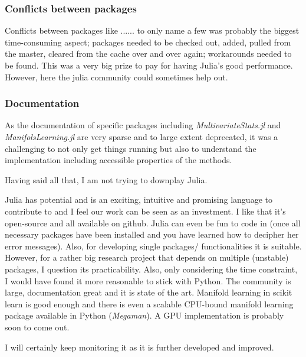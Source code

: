 \documentclass[journal, a4paper]{IEEEtran}
\begin{document}
\subsubsection{Conflicts between packages}
Conflicts between packages like ...... to only name a few was probably the biggest time-consuming aspect; packages needed to be checked out, added, pulled from the master, cleared from the cache over and over again; workarounds needed to be found. This was a very big prize to pay for having Julia's good performance. 
However, here the julia community could sometimes help out.

\subsubsection{Documentation}
As the documentation of specific packages including \textit{MultivariateStats.jl} and \textit{ManifolsLearning.jl} are very sparse and to large extent deprecated, it was a challenging to not only get things running but also to understand the implementation including accessible properties of the methods.

Having said all that, I am not trying to downplay Julia. 

Julia has potential and is an exciting, intuitive and promising language to contribute to and I feel our work can be seen as an investment. I like that it's open-source and all available on github. Julia can even be fun to code in (once all necessary packages have been installed and you have learned how to decipher her error messages). Also, for developing single packages/ functionalities it is suitable. However, for a rather big research project that depends on multiple (unstable) packages, I question its practicability.
Also, only considering the time constraint, I would have found it more reasonable to stick with Python. The community is large, documentation great and it is state of the art. Manifold learning in scikit learn is good enough and there is even a scalable CPU-bound manifold learning package available in Python (\textit{Megaman}). A GPU implementation is probably soon to come out. 

I will certainly keep monitoring it as it is further developed and improved. 
\end{document}
